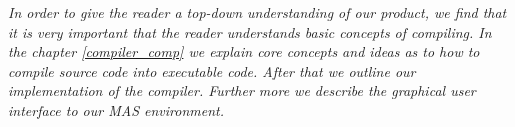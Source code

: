 \textit{In order to give the reader a top-down understanding of our product, we find that it is very important that the reader understands basic concepts of compiling. In the chapter \ref{compiler_comp} we explain core concepts and ideas as to how to compile source code into executable code. After that we outline our implementation of the compiler. Further more we describe the graphical user interface to our MAS environment.}\\ \\